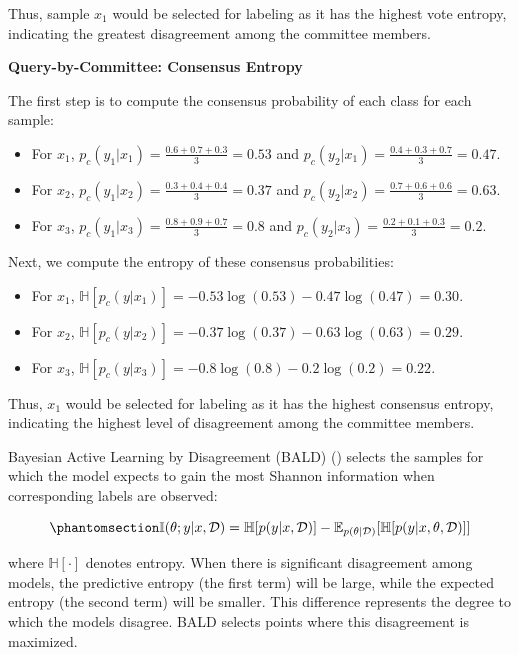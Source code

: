 \documentclass[
  letterpaper,
  numbers=noenddot,
  DIV=11]{scrreprt}
\providecommand{\tightlist}{%
  \setlength{\itemsep}{0pt}\setlength{\parskip}{0pt}}\usepackage{longtable,booktabs,array}
\theoremstyle{definition}
\theoremstyle{plain}
\theoremstyle{plain}
\theoremstyle{remark}
\begin{document}
Thus, sample \(x_1\) would be selected for labeling as it has the
highest vote entropy, indicating the greatest disagreement among the
committee members.

\textbf{Query-by-Committee: Consensus Entropy}

The first step is to compute the consensus probability of each class for
each sample:

\begin{itemize}
\tightlist
\item
  For \(x_1\), \(p_c(y_1|x_1) = \frac{0.6 + 0.7 + 0.3}{3} = 0.53\) and
  \(p_c(y_2|x_1) = \frac{0.4 + 0.3 + 0.7}{3} = 0.47\).
\item
  For \(x_2\), \(p_c(y_1|x_2) = \frac{0.3 + 0.4 + 0.4}{3} = 0.37\) and
  \(p_c(y_2|x_2) = \frac{0.7 + 0.6 + 0.6}{3} = 0.63\).
\item
  For \(x_3\), \(p_c(y_1|x_3) = \frac{0.8 + 0.9 + 0.7}{3} = 0.8\) and
  \(p_c(y_2|x_3) = \frac{0.2 + 0.1 + 0.3}{3} = 0.2\).
\end{itemize}

Next, we compute the entropy of these consensus probabilities:

\begin{itemize}
\tightlist
\item
  For \(x_1\),
  \(\mathbb{H}[p_c(y|x_1)] = -0.53 \log (0.53) - 0.47 \log (0.47) = 0.30\).
\item
  For \(x_2\),
  \(\mathbb{H}[p_c(y|x_2)] = -0.37 \log (0.37) - 0.63 \log (0.63) = 0.29\).
\item
  For \(x_3\),
  \(\mathbb{H}[p_c(y|x_3)] = -0.8 \log (0.8) - 0.2 \log (0.2) = 0.22\).
\end{itemize}

Thus, \(x_1\) would be selected for labeling as it has the highest
consensus entropy, indicating the highest level of disagreement among
the committee members.

Bayesian Active Learning by Disagreement (BALD)
() selects the samples for
which the model expects to gain the most Shannon information when
corresponding labels are observed:

\begin{equation}\phantomsection\label{eq-eq3.2}{
\mathbb{I}(\theta; y|x, \mathcal{D}) = \mathbb{H}[p(y|x, \mathcal{D})] - \mathbb{E}_{p(\theta | \mathcal{D})} [\mathbb{H}[p(y|x, \theta, \mathcal{D})]]
}\end{equation}

where \(\mathbb{H}[\cdot]\) denotes entropy. When there is significant
disagreement among models, the predictive entropy (the first term) will
be large, while the expected entropy (the second term) will be smaller.
This difference represents the degree to which the models disagree. BALD
selects points where this disagreement is maximized.
\end{document}
